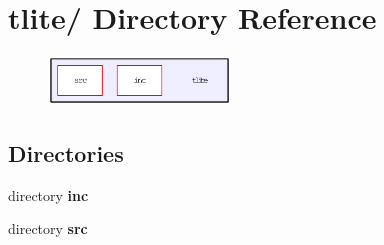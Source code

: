 \section{tlite/ Directory Reference}
\label{dir_06371048ee9e43c65161cc8cbbae14ce}


\begin{figure}[H]
\begin{center}
\leavevmode
\includegraphics[width=137pt]{dir_06371048ee9e43c65161cc8cbbae14ce_dep}
\end{center}
\end{figure}
\subsection*{Directories}
\begin{CompactItemize}
\item 
directory \bf{inc}
\item 
directory \bf{src}
\end{CompactItemize}
